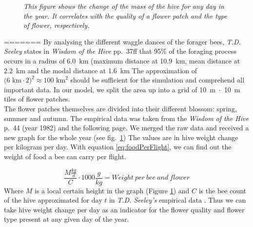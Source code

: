 			
				\begin{figure}
						\centering
						\caption{\textit{This figure shows the change of the mass of the hive for any day in the year. It correlates with the quality of a flower patch and the type of flower, respectively.}}
					\label{fig:seasonalFlowers}
					\end{figure}
=======
		By analysing the different waggle dances of the forager bees, \textit{T.D. Seeley} states in \textit{Wisdom of the Hive} pp.~37ff that 95\% of the foraging process occurs in a radius of 6.0~km (maximum distance at 10.9~km, mean distance at 2.2~km and the modal distance at 1.6~km \cite{seeley95} The approximation of $\text{(6~km}\cdot\text{2)}^2 \approx \text{100~km}^2$ should be sufficient for the simulation and comprehend all important data. In our model, we split the area up into a grid of 10~m~$\cdot$~10~m tiles of flower patches. \\
		The flower patches themselves are divided into their different blossom: spring, summer and autumn. The empirical data was taken from the \textit{Wisdom of the Hive} p.~44 (year 1982) and the following page. We merged the raw data and received a new graph for the whole year (see fig.~\ref{fig:seasonalFlowers}) The values are in hive weight change per kilogram per day. With equation \ref{eq:foodPerFlight}, we can find out the weight of food a bee can carry per flight.
		
		\begin{equation}\label{eq:foodPerFlight}
			\frac{M \frac{kg}{d}}{C}\cdot 1000 \frac{g}{kg} = Weight~per~bee~and~flower
		\end{equation}
		Where $M$ is a local certain height in the graph (Figure \ref{fig:seasonalFlowers}) and $C$ is the bee count of the hive approximated for day $t$ in \textit{T.D. Seeley's} empirical data \cite{seeley95}. Thus we can take hive weight change per day as an indicator for the flower quality and flower type present at any given day of the year. 
		
